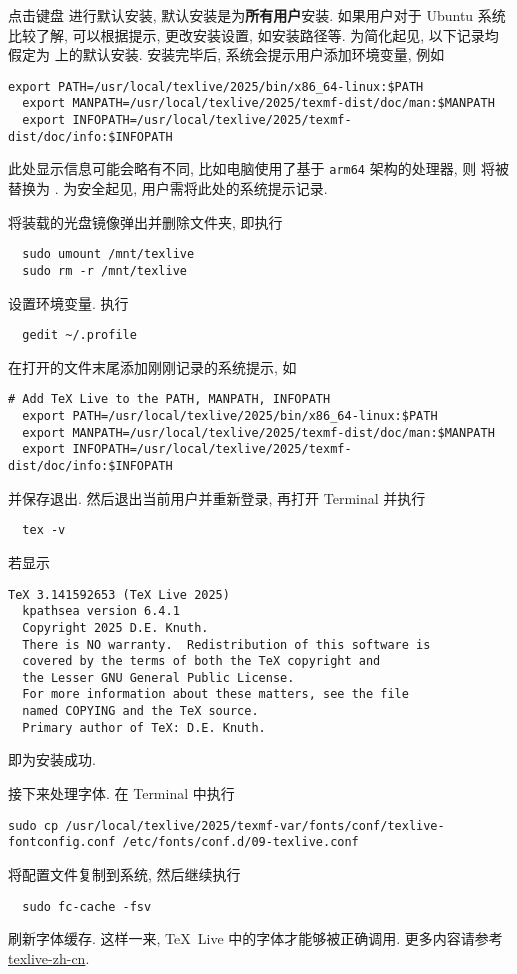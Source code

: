 点击键盘  进行默认安装,
默认安装是为\textbf{所有用户}安装.
如果用户对于 Ubuntu 系统比较了解,
可以根据提示,
更改安装设置,
如安装路径等.
为简化起见,
以下记录均假定为  上的默认安装.
安装完毕后,
系统会提示用户添加环境变量,
例如
\begin{lstlisting}[deletekeywords = local]
  export PATH=/usr/local/texlive/2025/bin/x86_64-linux:$PATH
  export MANPATH=/usr/local/texlive/2025/texmf-dist/doc/man:$MANPATH
  export INFOPATH=/usr/local/texlive/2025/texmf-dist/doc/info:$INFOPATH
\end{lstlisting}
此处显示信息可能会略有不同,
比如电脑使用了基于 \texttt{arm64} 架构的处理器,
则  将被替换为 .
为安全起见,
用户需将此处的系统提示记录.

将装载的光盘镜像弹出并删除文件夹,
即执行
\begin{lstlisting}
  sudo umount /mnt/texlive
  sudo rm -r /mnt/texlive
\end{lstlisting}

设置环境变量.
执行
\begin{lstlisting}
  gedit ~/.profile
\end{lstlisting}
在打开的文件末尾添加刚刚记录的系统提示,
如
\begin{lstlisting}[deletekeywords = local]
  # Add TeX Live to the PATH, MANPATH, INFOPATH
  export PATH=/usr/local/texlive/2025/bin/x86_64-linux:$PATH
  export MANPATH=/usr/local/texlive/2025/texmf-dist/doc/man:$MANPATH
  export INFOPATH=/usr/local/texlive/2025/texmf-dist/doc/info:$INFOPATH
\end{lstlisting}
并保存退出.
然后退出当前用户并重新登录,
再打开 \textsf{Terminal} 并执行
\begin{lstlisting}
  tex -v
\end{lstlisting}
若显示
\begin{lstlisting}[language = {}]
  TeX 3.141592653 (TeX Live 2025)
  kpathsea version 6.4.1
  Copyright 2025 D.E. Knuth.
  There is NO warranty.  Redistribution of this software is
  covered by the terms of both the TeX copyright and
  the Lesser GNU General Public License.
  For more information about these matters, see the file
  named COPYING and the TeX source.
  Primary author of TeX: D.E. Knuth.
\end{lstlisting}
即为安装成功.

接下来处理字体.
在 \textsf{Terminal} 中执行
\begin{lstlisting}[deletekeywords = local]
  sudo cp /usr/local/texlive/2025/texmf-var/fonts/conf/texlive-fontconfig.conf /etc/fonts/conf.d/09-texlive.conf
\end{lstlisting}
将配置文件复制到系统,
然后继续执行
\begin{lstlisting}
  sudo fc-cache -fsv
\end{lstlisting}
刷新字体缓存.
这样一来, \TeX~Live 中的字体才能够被正确调用.
更多内容请参考 \href{https://tug.org/texlive/doc/texlive-zh-cn/texlive-zh-cn.pdf}{\textsf{texlive-zh-cn}}.

